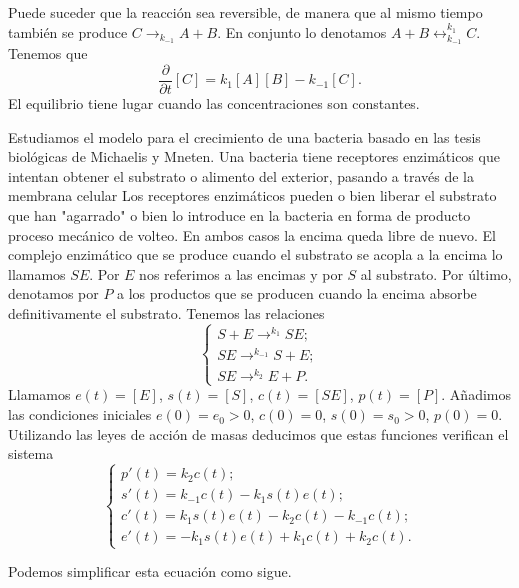 \documentclass{article}
\begin{document}
Puede suceder que la reacción sea reversible, de manera que al mismo tiempo también se produce
$C \rightarrow_{k_{-1}} A+B$. En conjunto lo denotamos $A+B \leftrightarrow_{k_{-1}}^{k_1}
C$. Tenemos que
\[ \frac{\partial}{\partial t}[C] = k_1 [A][B] - k_{-1}[C]. \] El equilibrio tiene lugar cuando las
concentraciones son constantes.

\begin{ex}
  Estudiamos el modelo para el crecimiento de una bacteria basado en las tesis biológicas de
  Michaelis y Mneten. Una bacteria tiene receptores enzimáticos que intentan obtener el substrato o
  alimento del exterior, pasando a través de la membrana celular Los receptores enzimáticos pueden o
  bien liberar el substrato que han "agarrado" o bien lo introduce en la bacteria en forma de
  producto proceso mecánico de volteo. En ambos casos la encima queda libre de nuevo. El complejo
  enzimático que se produce cuando el substrato se acopla a la encima lo llamamos $SE$. Por $E$ nos
  referimos a las encimas y por $S$ al substrato. Por último, denotamos por $P$ a los productos que
  se producen cuando la encima absorbe definitivamente el substrato. Tenemos las relaciones
  \begin{equation}
    \label{eq:5}
    \begin{cases}
      S + E \to ^{k_{1}} SE; \\
      SE \to ^{k_{-1}} S+E; \\
      SE \to^{k_2} E+P.
    \end{cases}
  \end{equation}
  Llamamos $e(t) = [E]$, $s(t) = [S]$, $c(t) = [SE]$, $p(t) = [P]$. Añadimos las condiciones
  iniciales $e(0) = e_0 > 0$, $c(0) = 0$, $s(0) = s_0 > 0$, $p(0) = 0$. Utilizando las leyes de
  acción de masas deducimos que estas funciones verifican el sistema
  \begin{equation}
    \label{eq:bacteria}
    \begin{cases}
      p'(t) = k_2 c(t); \\
      s'(t) = k_{-1}c(t) - k_1 s(t) e(t); \\
      c'(t) = k_1 s(t) e(t) - k_2 c(t) - k_{-1}c(t); \\
      e'(t) = -k_1 s(t) e(t) + k_1 c(t) + k_2 c(t).
    \end{cases}
  \end{equation}

  Podemos simplificar esta ecuación como sigue.


\end{ex}
\end{document}
